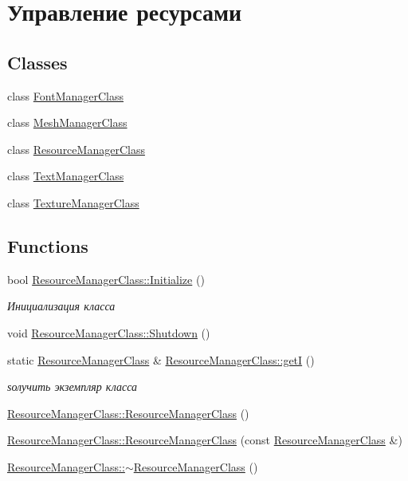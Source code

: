 \hypertarget{group___resource_managment}{}\section{Управление ресурсами}
\label{group___resource_managment}
\subsection*{Classes}
\begin{DoxyCompactItemize}
\item 
class \hyperlink{class_font_manager_class}{Font\+Manager\+Class}
\item 
class \hyperlink{class_mesh_manager_class}{Mesh\+Manager\+Class}
\item 
class \hyperlink{class_resource_manager_class}{Resource\+Manager\+Class}
\item 
class \hyperlink{class_text_manager_class}{Text\+Manager\+Class}
\item 
class \hyperlink{class_texture_manager_class}{Texture\+Manager\+Class}
\end{DoxyCompactItemize}
\subsection*{Functions}
\begin{DoxyCompactItemize}
\item 
bool \hyperlink{group___resource_managment_ga333d99b892f59b1871f24c534760f5e8}{Resource\+Manager\+Class\+::\+Initialize} ()
\begin{DoxyCompactList}\small\item\em Инициализация класса \end{DoxyCompactList}\item 
void \hyperlink{group___resource_managment_ga0b1a522696aa57d27d2c087c4da08200}{Resource\+Manager\+Class\+::\+Shutdown} ()
\item 
static \hyperlink{class_resource_manager_class}{Resource\+Manager\+Class} \& \hyperlink{group___resource_managment_gad93d52351dac048f1cd5201e6859ff53}{Resource\+Manager\+Class\+::getI} ()
\begin{DoxyCompactList}\small\item\em ѕолучить экземпляр класса \end{DoxyCompactList}\item 
\hyperlink{group___resource_managment_gae450c8971a22643cd706a16519e5a33a}{Resource\+Manager\+Class\+::\+Resource\+Manager\+Class} ()
\item 
\hyperlink{group___resource_managment_gaff7b246270fac0d5a7ba2c518323b130}{Resource\+Manager\+Class\+::\+Resource\+Manager\+Class} (const \hyperlink{class_resource_manager_class}{Resource\+Manager\+Class} \&)
\item 
\hyperlink{group___resource_managment_gad5e62785d102310401ea8468f962edb7}{Resource\+Manager\+Class\+::$\sim$\+Resource\+Manager\+Class} ()
\end{DoxyCompactItemize}
